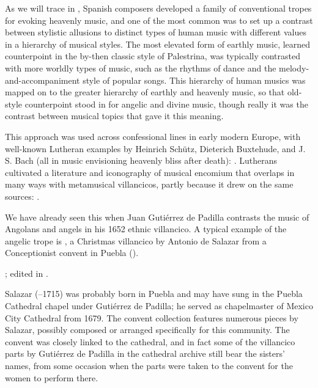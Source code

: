 
As we will trace in , Spanish composers developed a
family of conventional tropes for evoking heavenly music, and one of the most
common was to set up a contrast between stylistic allusions to distinct types
of human music with different values in a hierarchy of musical styles.
The most elevated form of earthly music, learned counterpoint in the by-then
classic style of Palestrina, was typically contrasted with more worldly types
of music, such as the rhythms of dance and the melody-and-accompaniment style
of popular songs.
This hierarchy of human musics was mapped on to the greater hierarchy of
earthly and heavenly music, so that old-style counterpoint stood in for
angelic and divine music, though really it was the contrast between musical
topics that gave it this meaning.%
\begin{Footnote}
    This approach was used across confessional lines in early modern Europe,
    with well-known Lutheran examples by Heinrich Schütz, Dieterich Buxtehude,
    and J. S. Bach (all in music envisioning heavenly bliss after death):
    \autocites
    {Johnston:Rhetorical}
    {Yearsley:Buxtehude}
    {Yearsley:BachCounterpoint}.
    Lutherans cultivated a literature and iconography of musical encomium that
    overlaps in many ways with metamusical villancicos, partly because it drew
    on the same sources:
    \autocite{Schmidt:Lob_der_Musik}.
\end{Footnote}
We have already seen this when Juan Gutiérrez de Padilla contrasts the music of
Angolans and angels in his 1652 ethnic villancico.
A typical example of the angelic trope is , a Christmas villancico by Antonio de Salazar from a Conceptionist
convent in Puebla ().%
\begin{Footnote} 
    ; edited in \autocite{Cashner:WLSCM32}.  
\end{Footnote}
Salazar (--1715) was probably born in Puebla and may have sung in
the Puebla Cathedral chapel under Gutiérrez de Padilla; he served as
chapelmaster of Mexico City Cathedral from 1679.%
    \Autocite{Koegel:Salazar} 
The convent collection features numerous pieces by Salazar, possibly composed
or arranged specifically for this community.
The convent was closely linked to the cathedral, and in fact some of the
villancico parts by Gutiérrez de Padilla in the cathedral archive still bear
the sisters' names, from some occasion when the parts were taken to the convent
for the women to perform there.%
    \Autocites
    {Favila:Profession}
    {Tello:SanchezGarzaCatalogo}

